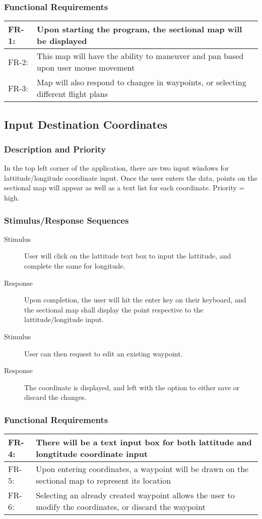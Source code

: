 \documentclass[12pt, letterpaper]{article}
\begin{document}
\subsubsection{Functional Requirements}
\begin{tabularx}{\textwidth}{|l|X|} \hline
FR-1: & Upon starting the program, the sectional map will be displayed\\ \hline
FR-2: & This map will have the ability to maneuver and pan based upon user mouse movement\\ \hline
FR-3: & Map will also respond to changes in waypoints, or selecting different flight plans\\ \hline
\end{tabularx}

\subsection{Input Destination Coordinates}
\subsubsection{Description and Priority}
In the top left corner of the application, there are two input windows for lattitude/longitude coordinate input.
Once the user enters the data, points on the sectional map will appear as well as a text list for each coordinate.
Priority = high.

\subsubsection{Stimulus/Response Sequences}
\begin{description}
    \item[Stimulus] User will click on the lattitude text box to input the lattitude, and complete the same for longitude.
    \item[Response] Upon completion, the user will hit the enter key on their keyboard,
        and the sectional map shall display the point respective to the lattitude/longitude input.
    \item[Stimulus] User can then request to edit an existing waypoint.
    \item[Response] The coordinate is displayed, and left with the option to either save or discard the changes.
\end{description}

\subsubsection{Functional Requirements}
\begin{tabularx}{\textwidth}{|l|X|} \hline
FR-4: & There will be a text input box for both lattitude and longtitude coordinate input\\ \hline
FR-5: & Upon entering coordinates, a waypoint will be drawn on the sectional map to represent its location\\ \hline
FR-6: & Selecting an already created waypoint allows the user to modify the coordinates, or discard the waypoint\\ \hline
\end{tabularx}
\end{document}
